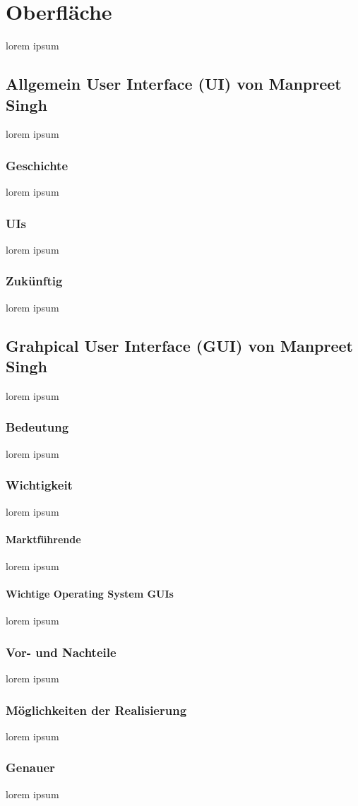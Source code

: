\documentclass[12pt,a4paper]{report}
\begin{document}
\chapter{Oberfläche}
lorem ipsum
\section{Allgemein User Interface (UI) von Manpreet Singh}
lorem ipsum
\subsection{Geschichte}
lorem ipsum
\subsection{UIs}
lorem ipsum 
\subsection{Zukünftig}
lorem ipsum 
\section{Grahpical User Interface (GUI) von Manpreet Singh}
lorem ipsum
\subsection{Bedeutung}
lorem ipsum
\subsection{Wichtigkeit}
lorem ipsum
\subsubsection{Marktführende}
lorem ipsum
\subsubsection{Wichtige Operating System GUIs}
lorem ipsum
\subsection{Vor- und Nachteile}
lorem ipsum
\subsection{Möglichkeiten der Realisierung}
lorem ipsum
\subsection{Genauer}
lorem ipsum
\end{document}

